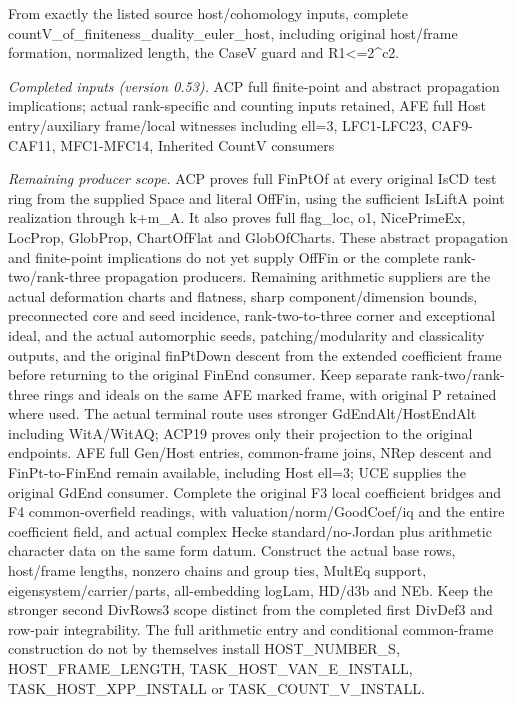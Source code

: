 \documentclass[11pt,a4paper]{article}
\numberwithin{equation}{section}
\theoremstyle{remark}\newtheorem{remark}[theorem]{Remark}
\begin{document}
From exactly the listed source host/cohomology inputs, complete countV\_\allowbreak of\_\allowbreak finiteness\_\allowbreak duality\_\allowbreak euler\_\allowbreak host, including original host/frame formation, normalized length, the CaseV guard and R1<=2\textasciicircum{}c2.

\emph{Completed inputs (version 0.53).} ACP full finite-point and abstract propagation implications; actual rank-specific and counting inputs retained, AFE full Host entry/auxiliary frame/local witnesses including ell=3, LFC1-LFC23, CAF9-CAF11, MFC1-MFC14, Inherited CountV consumers

\emph{Remaining producer scope.} ACP proves full FinPtOf at every original IsCD test ring from the supplied Space and literal OffFin, using the sufficient IsLiftA point realization through k+m\_\allowbreak A. It also proves full flag\_\allowbreak loc, o1, NicePrimeEx, LocProp, GlobProp, ChartOfFlat and GlobOfCharts. These abstract propagation and finite-point implications do not yet supply OffFin or the complete rank-two/rank-three propagation producers. Remaining arithmetic suppliers are the actual deformation charts and flatness, sharp component/dimension bounds, preconnected core and seed incidence, rank-two-to-three corner and exceptional ideal, and the actual automorphic seeds, patching/modularity and classicality outputs, and the original finPtDown descent from the extended coefficient frame before returning to the original FinEnd consumer. Keep separate rank-two/rank-three rings and ideals on the same AFE marked frame, with original P retained where used. The actual terminal route uses stronger GdEndAlt/HostEndAlt including WitA/WitAQ; ACP19 proves only their projection to the original endpoints. AFE full Gen/Host entries, common-frame joins, NRep descent and FinPt-to-FinEnd remain available, including Host ell=3; UCE supplies the original GdEnd consumer. Complete the original F3 local coefficient bridges and F4 common-overfield readings, with valuation/norm/GoodCoef/iq and the entire coefficient field, and actual complex Hecke standard/no-Jordan plus arithmetic character data on the same form datum. Construct the actual base rows, host/frame lengths, nonzero chains and group ties, MultEq support, eigensystem/carrier/parts, all-embedding logLam, HD/d3b and NEb. Keep the stronger second DivRows3 scope distinct from the completed first DivDef3 and row-pair integrability. The full arithmetic entry and conditional common-frame construction do not by themselves install HOST\_\allowbreak NUMBER\_\allowbreak S, HOST\_\allowbreak FRAME\_\allowbreak LENGTH, TASK\_\allowbreak HOST\_\allowbreak VAN\_\allowbreak E\_\allowbreak INSTALL, TASK\_\allowbreak HOST\_\allowbreak XPP\_\allowbreak INSTALL or TASK\_\allowbreak COUNT\_\allowbreak V\_\allowbreak INSTALL.
\end{document}
